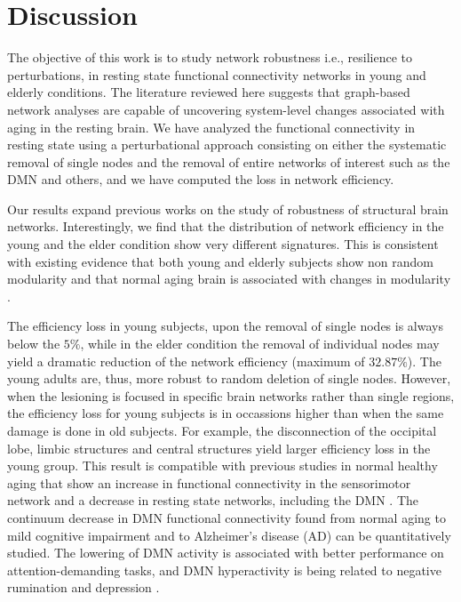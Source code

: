 \documentclass[12pt,a4paper]{article}
\begin{document}
\section{Discussion}
\label{discussion}

The objective of this work is to study network robustness i.e., resilience to
perturbations, in resting state functional connectivity networks in young and elderly conditions.
The literature reviewed here suggests that graph-based network
analyses are capable of uncovering system-level changes associated with
aging in the resting brain. 
We have analyzed the functional connectivity in resting state using a perturbational approach consisting on either the systematic removal of single nodes and the removal of entire networks of interest such as the DMN and others, and we have computed the loss in network efficiency.

Our results expand previous works on the study of robustness of
structural brain networks. %
Interestingly, we find that the distribution of network efficiency in the young and the elder condition show very different signatures. This is consistent with existing evidence \cite{meunier_age-related_2009} that both young and elderly subjects show non random modularity and that normal aging brain is associated with changes in modularity \cite{song_age-related_2014}.

The efficiency loss in young subjects, upon the removal of single nodes is always below the $5\%$, while in the elder condition the removal of individual nodes may yield a dramatic reduction of the network efficiency (maximum of $32.87\%$).
The young adults are, thus, more robust to random deletion of single nodes. However, when the lesioning is focused in specific brain networks rather than single regions, the efficiency loss for young subjects is in occassions higher than when the same damage is done in old subjects. For example, the disconnection of the occipital lobe, limbic structures and central structures yield larger efficiency loss in the young group. This result is compatible with previous studies in normal healthy aging that show an increase in functional connectivity in the sensorimotor network and a decrease in resting state networks, including the DMN \cite{song_age-related_2014}.
The continuum decrease in DMN functional connectivity found from normal aging to mild cognitive impairment and to Alzheimer's disease (AD) can be quantitatively studied. The lowering of DMN activity is associated with better performance on attention-demanding tasks, and DMN hyperactivity is being related to negative rumination and depression \cite{whitfield-gabrieli_default_2012}.    
\end{document}
